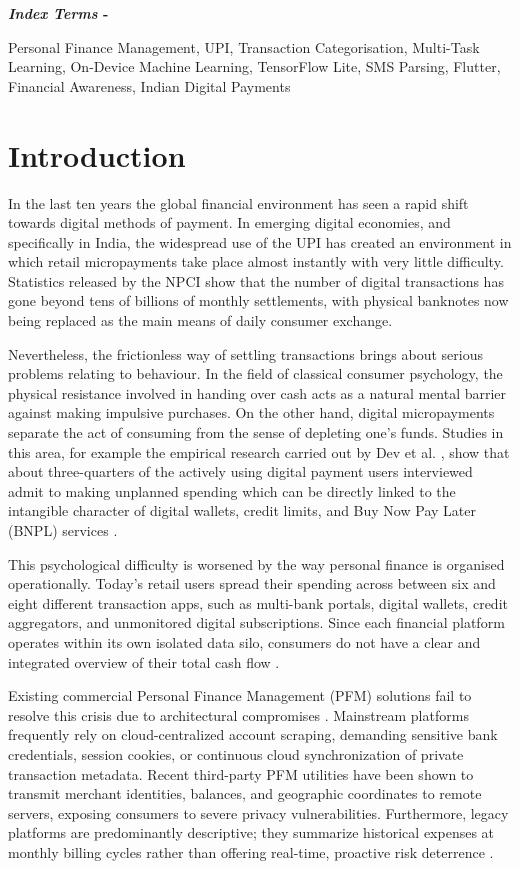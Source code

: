\documentclass[conference]{IEEEtran}
\renewenvironment{IEEEkeywords}{%
  \normalfont\footnotesize
  \bfseries\textit{Index Terms} - \normalfont\footnotesize\ignorespaces
}{%
  \vspace{1.2ex}\par
}
\begin{document}
\begin{IEEEkeywords}
Personal Finance Management, UPI, Transaction Categorisation, Multi-Task Learning, On-Device Machine Learning, TensorFlow Lite, SMS Parsing, Flutter, Financial Awareness, Indian Digital Payments
\end{IEEEkeywords}

\section{Introduction}
In the last ten years the global financial environment has seen a rapid shift towards digital methods of payment. In emerging digital economies, and specifically in India, the widespread use of the UPI has created an environment in which retail micropayments take place almost instantly with very little difficulty. Statistics released by the NPCI show that the number of digital transactions has gone beyond tens of billions of monthly settlements, with physical banknotes now being replaced as the main means of daily consumer exchange.

Nevertheless, the frictionless way of settling transactions brings about serious problems relating to behaviour. In the field of classical consumer psychology, the physical resistance involved in handing over cash acts as a natural mental barrier against making impulsive purchases. On the other hand, digital micropayments separate the act of consuming from the sense of depleting one's funds. Studies in this area, for example the empirical research carried out by Dev et al. \cite{dev2024}, show that about three-quarters of the actively using digital payment users interviewed admit to making unplanned spending which can be directly linked to the intangible character of digital wallets, credit limits, and Buy Now Pay Later (BNPL) services \cite{gerrans2021}.

This psychological difficulty is worsened by the way personal finance is organised operationally. Today's retail users spread their spending across between six and eight different transaction apps, such as multi-bank portals, digital wallets, credit aggregators, and unmonitored digital subscriptions. Since each financial platform operates within its own isolated data silo, consumers do not have a clear and integrated overview of their total cash flow \cite{kaiser2022}.

Existing commercial Personal Finance Management (PFM) solutions fail to resolve this crisis due to architectural compromises \cite{pew2022}. Mainstream platforms frequently rely on cloud-centralized account scraping, demanding sensitive bank credentials, session cookies, or continuous cloud synchronization of private transaction metadata. Recent third-party PFM utilities have been shown to transmit merchant identities, balances, and geographic coordinates to remote servers, exposing consumers to severe privacy vulnerabilities. Furthermore, legacy platforms are predominantly descriptive; they summarize historical expenses at monthly billing cycles rather than offering real-time, proactive risk deterrence \cite{compen2022}.
\end{document}
